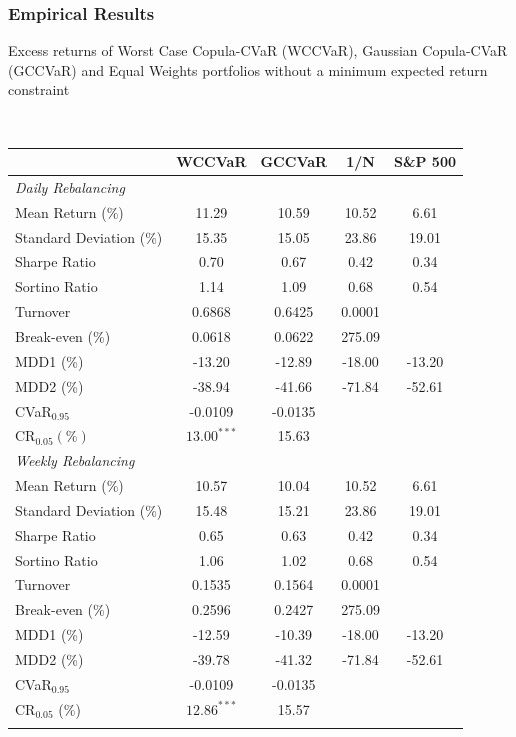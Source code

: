 \documentclass[pdf,10pt,xcolor=dvipsnames,hide notes]{beamer}
\begin{document}
\begin{frame}
	\frametitle{Empirical Results}
	
	
	\begin{threeparttable}[H]
		\caption{Excess returns of Worst Case Copula-CVaR (WCCVaR), Gaussian Copula-CVaR (GCCVaR) and Equal Weights portfolios without a minimum expected return constraint}
		\label{tab:tabletwo}\centering
		\tiny \
		\begin{tabularx}{\textwidth}{@{\extracolsep{\fill}}lcccc@{}}
			\toprule & \textbf{WCCVaR} & \textbf{GCCVaR} & \textbf{1/N} & \textbf{S\&P 500%
			} \\
			\midrule[\heavyrulewidth] \textit{Daily Rebalancing} &  &  &  &  \\
			\midrule[\heavyrulewidth] Mean Return (\%) & \cellcolor{corn} 11.29 & 10.59 & 10.52 & 6.61
			\\
			Standard Deviation (\%) & 15.35 & \cellcolor{celadon} 15.05 & 23.86 & 19.01 \\
			Sharpe Ratio & \cellcolor{corn} 0.70 & 0.67 & 0.42 & 0.34 \\
			Sortino Ratio & 1.14 & 1.09 & 0.68 & 0.54 \\
			Turnover & 0.6868 & 0.6425 & 0.0001 &  \\
			Break-even (\%) & 0.0618 & 0.0622 & 275.09 &  \\
			MDD1 (\%) & -13.20 & \cellcolor{celadon} -12.89 & -18.00 & -13.20 \\
			MDD2 (\%) & \cellcolor{corn} -38.94 & -41.66 & -71.84 & -52.61 \\
			CVaR$_{0.95}$ & \cellcolor{corn} -0.0109 & -0.0135 &  &  \\
			CR$_{0.05} (\%)$ & \cellcolor{corn} $13.00^{***}$ & 15.63 &  &  \\
			\midrule[\heavyrulewidth] \textit{Weekly Rebalancing} &  &  &  &  \\
			\midrule[\heavyrulewidth] Mean Return (\%) & 10.57 & 10.04 & 10.52 & 6.61
			\\
			Standard Deviation (\%) & 15.48 & 15.21 & 23.86 & 19.01 \\
			Sharpe Ratio & 0.65 & 0.63 & 0.42 & 0.34 \\
			Sortino Ratio & 1.06 & 1.02 & 0.68 & 0.54 \\
			Turnover & 0.1535 & 0.1564 & 0.0001 &  \\
			Break-even (\%) & \cellcolor{corn} 0.2596 & 0.2427 & 275.09 &  \\
			MDD1 (\%) & -12.59 & -10.39 & -18.00 & -13.20 \\
			MDD2 (\%) & -39.78 & -41.32 & -71.84 & -52.61 \\
			CVaR$_{0.95}$ & -0.0109 & -0.0135 &  & \\
			CR$_{0.05}$ (\%) & $12.86^{***}$ & 15.57 &  &  \\
			\bottomrule &  &  &  &
		\end{tabularx}%
		\label{tab:table02}%
	\end{threeparttable}

	
\end{frame}
\end{document}
